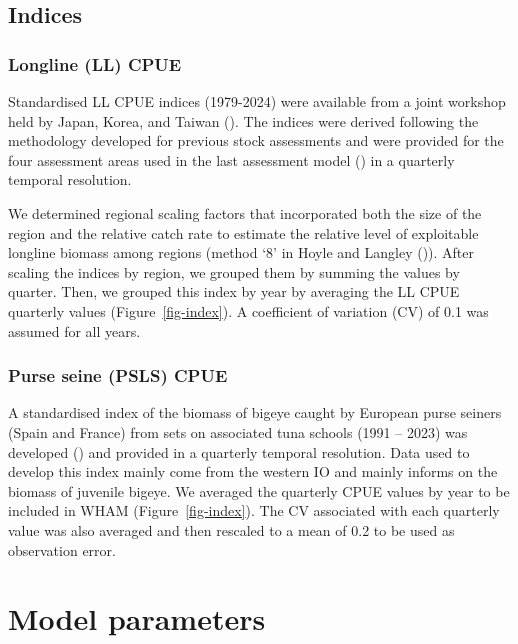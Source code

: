 \documentclass[
]{scrartcl}
\begin{document}
\subsection{Indices}\label{indices}

\subsubsection{Longline (LL) CPUE}\label{sec-llcpue}

Standardised LL CPUE indices (1979-2024) were available from a joint
workshop held by Japan, Korea, and Taiwan
(). The
indices were derived following the methodology developed for previous
stock assessments and were provided for the four assessment areas used
in the last assessment model
() in a
quarterly temporal resolution.

We determined regional scaling factors that incorporated both the size
of the region and the relative catch rate to estimate the relative level
of exploitable longline biomass among regions (method `8' in Hoyle and
Langley ()).
After scaling the indices by region, we grouped them by summing the
values by quarter. Then, we grouped this index by year by averaging the
LL CPUE quarterly values (Figure~\ref{fig-index}). A coefficient of
variation (CV) of 0.1 was assumed for all years.

\subsubsection{Purse seine (PSLS) CPUE}\label{purse-seine-psls-cpue}

A standardised index of the biomass of bigeye caught by European purse
seiners (Spain and France) from sets on associated tuna schools (1991 --
2023) was developed
()
and provided in a quarterly temporal resolution. Data used to develop
this index mainly come from the western IO and mainly informs on the
biomass of juvenile bigeye. We averaged the quarterly CPUE values by
year to be included in WHAM (Figure~\ref{fig-index}). The CV associated
with each quarterly value was also averaged and then rescaled to a mean
of 0.2 to be used as observation error.

\section{Model parameters}\label{model-parameters}
\end{document}
